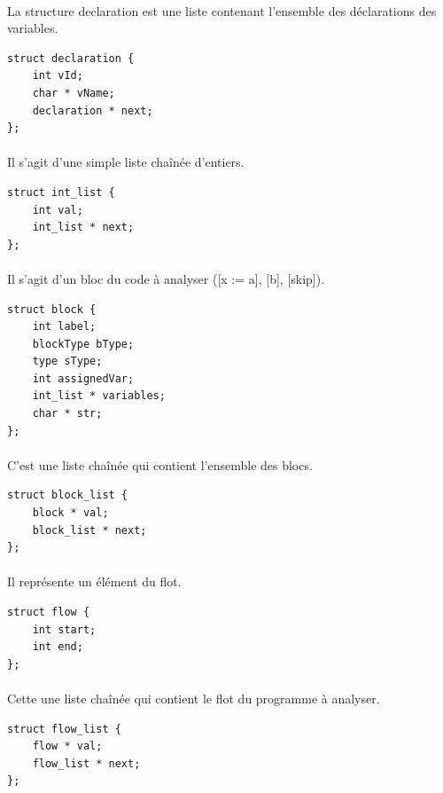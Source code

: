 \documentclass[12pt,a4paper,oneside]{article}
\begin{document}
\paragraph{}
La structure declaration est une liste contenant l'ensemble des déclarations des variables.
\begin{lstlisting}
struct declaration {
	int vId;
	char * vName;
	declaration * next;
};
\end{lstlisting}

\paragraph{}
Il s'agit d'une simple liste chaînée d'entiers.
\begin{lstlisting}
struct int_list {
	int val;
	int_list * next;
};
\end{lstlisting}

\paragraph{}
Il s'agit d'un bloc du code à analyser ([x := a], [b], [skip]).
\begin{lstlisting}
struct block {
	int label;
	blockType bType;
	type sType;
	int assignedVar;
	int_list * variables;
	char * str;
};
\end{lstlisting}

\paragraph{}
C'est une liste chaînée qui contient l'ensemble des blocs.
\begin{lstlisting}
struct block_list {
	block * val;
	block_list * next;
};
\end{lstlisting}

\paragraph{}
Il représente un élément du flot.
\begin{lstlisting}
struct flow {
	int start;
	int end;
};
\end{lstlisting}

\paragraph{}
Cette une liste chaînée qui contient le flot du programme à analyser.
\begin{lstlisting}
struct flow_list {
	flow * val;
	flow_list * next;
};
\end{lstlisting}
\end{document}
